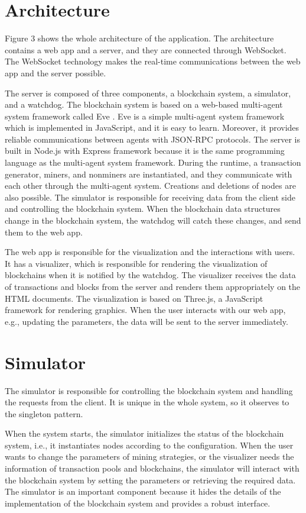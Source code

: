 \section{Architecture}

Figure 3 shows the whole architecture of the application. The architecture contains a web app and a server, and they are connected through WebSocket. The WebSocket technology makes the real-time communications between the web app and the server possible.

The server is composed of three components, a blockchain system, a simulator, and a watchdog. The blockchain system is based on a web-based multi-agent system framework called Eve \cite{eve}. Eve is a simple multi-agent system framework which is implemented in JavaScript, and it is easy to learn. Moreover, it provides reliable communications between agents with JSON-RPC protocols. The server is built in Node.js with Express framework because it is the same programming language as the multi-agent system framework. During the runtime, a transaction generator, miners, and nonminers are instantiated, and they communicate with each other through the multi-agent system. Creations and deletions of nodes are also possible. The simulator is responsible for receiving data from the client side and controlling the blockchain system. When the blockchain data structures change in the blockchain system, the watchdog will catch these changes, and send them to the web app. 

The web app is responsible for the visualization and the interactions with users. It has a visualizer, which is responsible for rendering the visualization of blockchains when it is notified by the watchdog. The visualizer receives the data of transactions and blocks from the server and renders them appropriately on the HTML documents. The visualization is based on Three.js, a JavaScript framework for rendering graphics. When the user interacts with our web app, e.g., updating the parameters, the data will be sent to the server immediately.

\section{Simulator}

The simulator is responsible for controlling the blockchain system and handling the requests from the client. It is unique in the whole system, so it observes to the singleton pattern.

When the system starts, the simulator initializes the status of the blockchain system, i.e., it instantiates nodes according to the configuration. When the user wants to change the parameters of mining strategies, or the visualizer needs the information of transaction pools and blockchains, the simulator will interact with the blockchain system by setting the parameters or retrieving the required data. The simulator is an important component because it hides the details of the implementation of the blockchain system and provides a robust interface.

